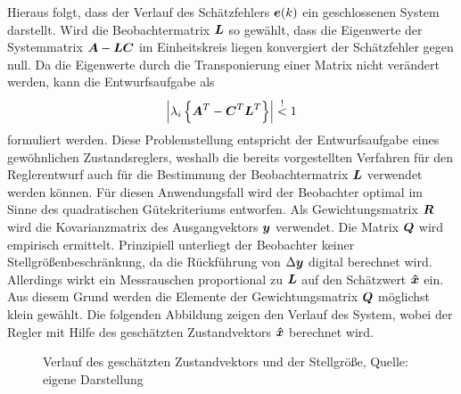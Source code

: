 Hieraus folgt, dass der Verlauf des Schätzfehlers $\boldsymbol{e}(k)$ ein geschlossenen System darstellt. Wird die Beobachtermatrix $\boldsymbol{L}$ so gewählt, dass die Eigenwerte der Systemmatrix $\boldsymbol{A}-\boldsymbol{LC}$ im Einheitskreis liegen konvergiert der Schätzfehler gegen null. Da die Eigenwerte durch die Transponierung einer Matrix nicht verändert werden, kann die Entwurfsaufgabe als
\begin{equation}
\left\vert \lambda_i\left\{\boldsymbol{A}^T-\boldsymbol{C}^T\boldsymbol{L}^T\right\}\right\vert \overset{!}< 1
\end{equation}
formuliert werden. Diese Problemstellung entspricht der Entwurfsaufgabe eines gewöhnlichen Zustandsreglers, weshalb die bereits vorgestellten Verfahren für den Reglerentwurf auch für die Bestimmung der Beobachtermatrix $\boldsymbol{L}$ verwendet werden können. Für diesen Anwendungsfall wird der Beobachter optimal im Sinne des quadratischen Gütekriteriums entworfen. Als Gewichtungsmatrix $\boldsymbol{R}$ wird die Kovarianzmatrix des Ausgangvektors $\boldsymbol{y}$ verwendet. Die Matrix $\boldsymbol{Q}$ wird empirisch ermittelt. Prinzipiell unterliegt der Beobachter keiner Stellgrößenbeschränkung, da die Rückführung von $\Delta\boldsymbol{y}$ digital berechnet wird. Allerdings wirkt ein Messrauschen proportional zu $\boldsymbol{L}$ auf den Schätzwert $\boldsymbol{\hat{x}}$ ein. Aus diesem Grund werden die Elemente der Gewichtungsmatrix $\boldsymbol{Q}$ möglichst klein gewählt. Die folgenden Abbildung zeigen den Verlauf des System, wobei der Regler mit Hilfe des geschätzten Zustandvektors $\boldsymbol{\hat{x}}$ berechnet wird.
\begin{figure}[h!]
\label{plots_phiobs}
\caption{Verlauf des geschätzten Zustandvektors und der Stellgröße, Quelle: eigene Darstellung}
\end{figure}